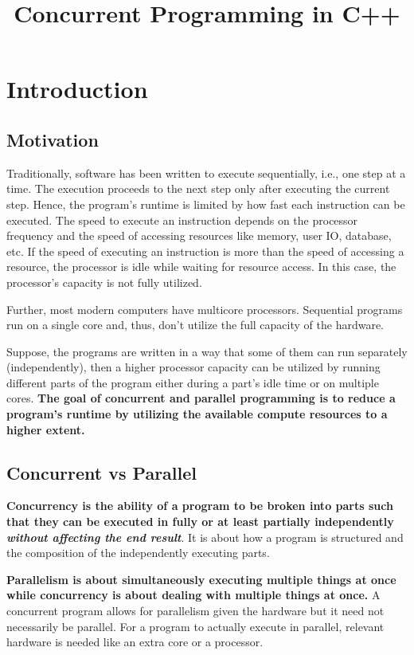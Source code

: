 \documentclass{scrartcl}
\title{Concurrent Programming in C++}
\date{ }
\begin{document}
\maketitle
\tableofcontents

\section{Introduction}
\subsection{Motivation}
Traditionally, software has been written to execute sequentially, i.e., one step at a time. The execution proceeds to the next step only after executing the current step. Hence, the program's runtime is limited by how fast each instruction can be executed. The speed to execute an instruction depends on the processor frequency and the speed of accessing resources like memory, user IO, database, etc. If the speed of executing an instruction is more than the speed of accessing a resource, the processor is idle while waiting for resource access. In this case, the processor's capacity is not fully utilized.

Further, most modern computers have multicore processors. Sequential programs run on a single core and, thus, don't utilize the full capacity of the hardware. 

Suppose, the programs are written in a way that some of them can run separately (independently), then a higher processor capacity can be utilized by running different parts of the program either during a part's idle time or on multiple cores. \textbf{The goal of concurrent and parallel programming is to reduce a program's runtime by utilizing the available compute resources to a higher extent.}

\subsection{Concurrent vs Parallel}
\textbf{Concurrency is the ability of a program to be broken into parts such that they can be executed in fully or at least partially independently \textit{without affecting the end result}}. It is about how a program is structured and the composition of the independently executing parts.

\textbf{Parallelism is about simultaneously executing multiple things at once while concurrency is about dealing with multiple things at once.} A concurrent program allows for parallelism given the hardware but it need not necessarily be parallel. For a program to actually execute in parallel, relevant hardware is needed like an extra core or a processor. %
\end{document}
